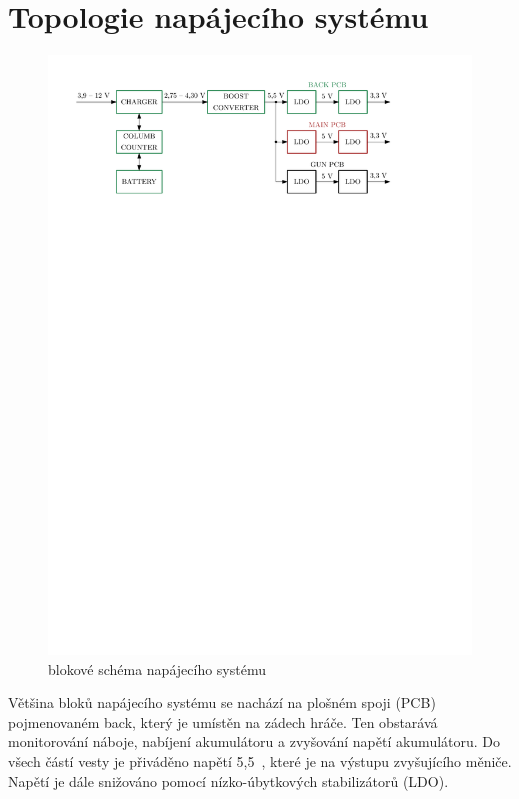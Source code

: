 \section{Topologie napájecího systému}
\begin{figure}[H]
    \begin{center}
        \includegraphics[width=\textwidth]{img/power-system}
    \end{center}
    \caption{blokové schéma napájecího systému}
\end{figure}

Většina bloků napájecího systému se nachází na plošném spoji (PCB) pojmenovaném back, který je umístěn na zádech hráče. Ten obstarává monitorování náboje, nabíjení akumulátoru a zvyšování napětí akumulátoru. Do všech částí vesty je přiváděno napětí 5,5~, které je na výstupu zvyšujícího měniče. Napětí je dále snižováno pomocí nízko-úbytkových stabilizátorů (LDO).
